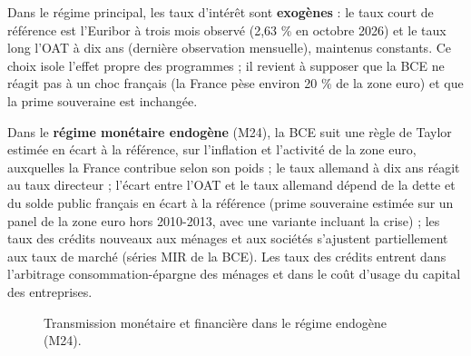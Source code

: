 \documentclass[
  11pt,
  11pt,
  a4paper,
  openany]{book}
\begin{document}
Dans le régime principal, les taux d'intérêt sont \textbf{exogènes} : le
taux court de référence est l'Euribor à trois mois observé (2,63 \% en
octobre 2026) et le taux long l'OAT à dix ans (dernière observation
mensuelle), maintenus constants. Ce choix isole l'effet propre des
programmes ; il revient à supposer que la BCE ne réagit pas à un choc
français (la France pèse environ 20 \% de la zone euro) et que la prime
souveraine est inchangée.

Dans le \textbf{régime monétaire endogène} (M24), la BCE suit une règle
de Taylor estimée en écart à la référence, sur l'inflation et l'activité
de la zone euro, auxquelles la France contribue selon son poids ; le
taux allemand à dix ans réagit au taux directeur ; l'écart entre l'OAT
et le taux allemand dépend de la dette et du solde public français en
écart à la référence (prime souveraine estimée sur un panel de la zone
euro hors 2010-2013, avec une variante incluant la crise) ; les taux des
crédits nouveaux aux ménages et aux sociétés s'ajustent partiellement
aux taux de marché (séries MIR de la BCE). Les taux des crédits entrent
dans l'arbitrage consommation-épargne des ménages et dans le coût
d'usage du capital des entreprises.

\begin{figure}[htbp]
\centering
{}
\caption{Transmission monétaire et financière dans le régime endogène (M24).}
\end{figure}
\end{document}
